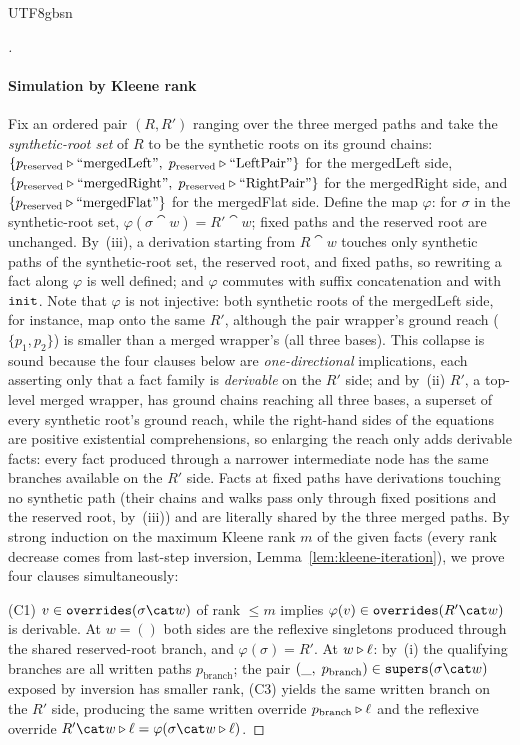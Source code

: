 \begin{CJK*}{UTF8}{gbsn}
\begin{proof}[]
  \paragraph{Simulation by Kleene rank}
  Fix an ordered pair $(R, R')$ ranging over the three merged paths
  and take the \emph{synthetic-root set} of $R$ to be the synthetic
  roots on its ground chains:
  $\{p_{\mathrm{reserved}} \mathbin{\triangleright} \text{``mergedLeft''},\;
  p_{\mathrm{reserved}} \mathbin{\triangleright} \text{``LeftPair''}\}$ for the
  mergedLeft side,
  $\{p_{\mathrm{reserved}} \mathbin{\triangleright} \text{``mergedRight''},\;
  p_{\mathrm{reserved}} \mathbin{\triangleright} \text{``RightPair''}\}$ for the
  mergedRight side, and
  $\{p_{\mathrm{reserved}} \mathbin{\triangleright} \text{``mergedFlat''}\}$ for the
  mergedFlat side. Define the map $\varphi$: for $\sigma$ in the
  synthetic-root set, $\varphi(\sigma \cat w) = R' \cat w$; fixed
  paths and the reserved root are unchanged. By~(iii), a derivation
  starting from $R \cat w$ touches only synthetic paths of the
  synthetic-root set, the reserved root, and fixed paths, so
  rewriting a fact along $\varphi$ is well defined; and $\varphi$
  commutes with suffix concatenation and with $\mathtt{init}$. Note that
  $\varphi$ is not injective: both synthetic roots of the mergedLeft
  side, for instance, map onto the same $R'$, although the pair
  wrapper's ground reach ($\{p_1, p_2\}$) is smaller than a merged
  wrapper's (all three bases). This collapse is sound because the
  four clauses below are \emph{one-directional} implications, each
  asserting only that a fact family is \emph{derivable} on the $R'$
  side; and by~(ii) $R'$, a top-level merged wrapper, has ground
  chains reaching all three bases, a superset of every synthetic
  root's ground reach, while the right-hand sides of the equations
  are positive existential comprehensions, so enlarging the reach
  only adds derivable facts: every fact produced through a narrower
  intermediate node has the same branches available on the $R'$
  side. Facts at
  fixed paths have derivations touching no synthetic path (their
  chains and walks pass only through fixed positions and the
  reserved root, by~(iii)) and are literally shared by the three
  merged paths. By strong induction on the
  maximum Kleene rank $m$ of the given facts (every rank decrease
  comes from last-step inversion, Lemma~\ref{lem:kleene-iteration}),
  we prove four clauses simultaneously:

  (C1) $v \in \overrides(\sigma \cat w)$ of rank $\le m$ implies
  $\varphi(v) \in \overrides(R' \cat w)$ is derivable. At $w = ()$
  both sides are the reflexive singletons produced through the
  shared reserved-root branch, and $\varphi(\sigma) = R'$. At
  $w \mathbin{\triangleright} \ell$: by~(i) the
  qualifying branches are all written paths $p_{\mathrm{branch}}$;
  the pair $(\_,\; p_{\mathrm{branch}}) \in \supers(\sigma \cat w)$
  exposed by inversion has smaller rank, (C3) yields the same
  written branch on the $R'$ side, producing the same written
  override $p_{\mathrm{branch}} \mathbin{\triangleright} \ell$ and the reflexive
  override $R' \cat w \snoc \ell = \varphi(\sigma \cat w \snoc \ell)$.


\end{proof}
\end{CJK*}
